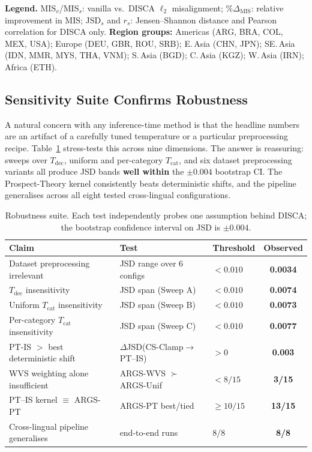 \documentclass{article}
\begin{document}
\begin{table}[tp]
{\begin{tabular}{@{}ll ccccc ccccc ccccc ccccc ccccc ccccc@{}}
\bottomrule
\end{tabular}%
}
\vspace{3pt}\footnotesize \textbf{Legend.} MIS$_v$/MIS$_s$: vanilla vs.\ DISCA $\ell_2$ misalignment; \%$\Delta_{\mathrm{MIS}}$: relative improvement in MIS; JSD$_s$ and $r_s$: Jensen--Shannon distance and Pearson correlation for DISCA only. \textbf{Region groups:} Americas (ARG, BRA, COL, MEX, USA); Europe (DEU, GBR, ROU, SRB); E.\,Asia (CHN, JPN); SE.\,Asia (IDN, MMR, MYS, THA, VNM); S.\,Asia (BGD); C.\,Asia (KGZ); W.\,Asia (IRN); Africa (ETH).
\end{table}

\subsection{Sensitivity Suite Confirms Robustness}
\label{sec:robustness}

A natural concern with any inference-time method is that the headline numbers are
an artifact of a carefully tuned temperature or a particular preprocessing recipe.
Table~\ref{tab:robustness_summary} stress-tests this across nine dimensions.
The answer is reassuring: sweeps over $T_{\text{dec}}$, uniform and per-category
$T_{\text{cat}}$, and six dataset preprocessing variants all produce JSD bands
\textbf{well within} the $\pm 0.004$ bootstrap CI.
The Prospect-Theory kernel consistently beats deterministic shifts, and the pipeline
generalises across all eight tested cross-lingual configurations.

\begin{table}[h]\centering\small
\caption{Robustness suite. Each test independently probes one assumption
behind DISCA; the bootstrap confidence interval on JSD is $\pm 0.004$.}
\label{tab:robustness_summary}
\setlength{\tabcolsep}{4pt}
\begin{tabular}{lllc}\toprule
Claim & Test & Threshold & Observed \\\midrule
Dataset preprocessing irrelevant & JSD range over 6 configs & $<\!0.010$ & \textbf{0.0034} \\
$T_\text{dec}$ insensitivity & JSD span (Sweep A) & $<\!0.010$ & \textbf{0.0074} \\
Uniform $T_\text{cat}$ insensitivity & JSD span (Sweep B) & $<\!0.010$ & \textbf{0.0073} \\
Per-category $T_\text{cat}$ insensitivity & JSD span (Sweep C) & $<\!0.010$ & \textbf{0.0077} \\
PT-IS $>$ best deterministic shift & $\Delta$JSD(CS-Clamp$\to$PT--IS) & $>\!0$ & \textbf{0.003} \\
WVS weighting alone insufficient & ARGS-WVS $\succ$ ARGS-Unif & $<\!8/15$ & \textbf{3/15} \\
PT--IS kernel $\equiv$ \textsc{ARGS-PT} & ARGS-PT best/tied & $\ge 10/15$ & \textbf{13/15} \\
Cross-lingual pipeline generalises & end-to-end runs & 8/8 & \textbf{8/8} \\\bottomrule
\end{tabular}
\end{table}
\end{document}
